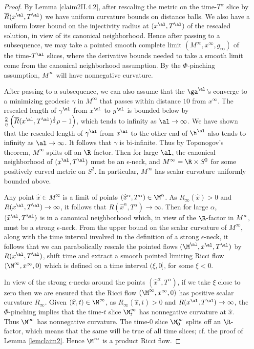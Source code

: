 \begin{proof}
By Lemma \ref{claim2II.4.2}, after rescaling the metric on the
time-$T^\alpha$ slice by $\overline{R}(x^\al,T^\al)$ we have uniform curvature
bounds on distance balls.
We also have a uniform lower bound on the injectivity radius at
$(x^\al,T^\al)$ of the rescaled solution, in view of its
canonical neighborhood.  Hence after passing to
a subsequence, we may take a pointed
smooth complete limit $(M^\infty, x^\infty, g_\infty)$
of the time-$T^\al$ slices, where the derivative bounds needed to
take a smooth limit come from the canonical neighborhood assumption.
By the $\Phi$-pinching
assumption, $M^\infty$ will have nonnegative curvature.

After passing to a subsequence, we can also assume that
the $\ga^\al$'s converge to
a minimizing geodesic $\gamma$ in $M^\infty$ that passes within distance $10$
from $x^\infty$.
The
rescaled length of $\gamma^\al$ from $x^\al$ to $y^\al$ is
bounded below by $\frac{2}{\eta} \left( \overline{R}(x^\al, T^\al)^{\frac12} \rho - 1 \right)$,
which tends to infinity as $\al \rightarrow \infty$.
We have shown that the rescaled length of $\gamma^\al$ from
$x^\al$ to the other end of $\h^\al$ also tends to infinity as
$\al \rightarrow \infty$.
It follows that $\gamma$ is bi-infinite.
Thus by Toponogov's
theorem, $M^\infty$ splits off an $\R$-factor. Then for large $\al$,
the canonical neighborhood of $(x^\al,T^\al)$
must be an $\epsilon$-neck, and $M^\infty = \R \times S^2$
for some positively curved metric on $S^2$.  In particular,
$M^\infty$ has scalar curvature uniformly bounded above.

Any point
$\widehat{x} \in M^\infty$ is a limit of points
$(\widehat{x}^\alpha, T^\alpha) \in \M^\alpha$. As
$R_\infty(\widehat{x}) > 0$ and $R(x^\al,T^\al) \rightarrow \infty$, it
follows that $R(\widehat{x}^\alpha, T^\alpha) \rightarrow \infty$. Then
for large $\alpha$, $(\widehat{x}^\al,T^\al)$ is in a canonical
neighborhood which, in view of the $\R$-factor in $M^\infty$, must
be a strong $\epsilon$-neck.  From the upper bound on the scalar
curvature of $M^\infty$, along with the time interval involved in
the definition of a strong $\epsilon$-neck, it follows that
we can parabolically rescale the pointed flows
$(\M^\al,x^\al,T^\al)$ by $R(x^\al,T^\al)$, shift
time and
extract a smooth pointed limiting Ricci flow
$(\M^\infty,x^\infty,0)$ which is defined on a time
interval $(\xi,0]$, for some $\xi<0$.

In view of the strong $\epsilon$-necks around the
points $(\widehat{x}^\alpha, T^\alpha)$, if we take
$\xi$ close to zero
then we are ensured that the Ricci flow
$(\M^\infty,x^\infty,0)$ has positive
scalar curvature $R_\infty$. Given $(\widehat{x}, t) \in \M^\infty$,
as $R_\infty(\widehat{x}, t) > 0$ and $R(x^\al,T^\al) \rightarrow \infty$,
the $\Phi$-pinching implies that
the time-$t$ slice $\M^\infty_t$ has nonnegative curvature at
$\widehat{x}$. Thus $\M^\infty$ has nonnegative curvature.
The time-$0$ slice $\M^\infty_0$
splits off an $\R$-factor,
which means that the same will be true of all time slices;
cf. the proof of Lemma \ref{lemclaim2}. Hence
$\M^\infty$ is a product Ricci flow.


\end{proof}
